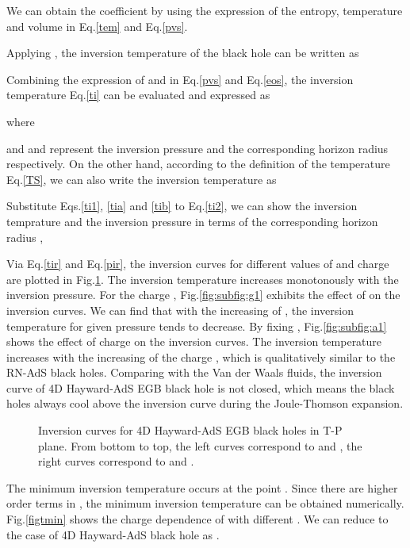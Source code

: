 \documentclass[aps,11pt]{revtex4}
\begin{document}
We can obtain the coefficient  by using the expression of the entropy, temperature and volume in Eq.\ref{tem} and Eq.\ref{pvs}.

Applying , the inversion temperature of the black hole can be written as

Combining the expression of  and  in Eq.\ref{pvs} and Eq.\ref{eos}, the inversion temperature Eq.\ref{ti} can be evaluated and expressed as

where

and  and  represent the inversion pressure and the corresponding horizon radius respectively. On the other hand, according to the definition of the temperature Eq.\ref{TS}, we can also write the inversion temperature as

Substitute Eqs.\ref{ti1}, \ref{tia} and \ref{tib} to Eq.\ref{ti2}, we can show the inversion temprature and the inversion pressure in terms of the corresponding horizon radius ,

Via Eq.\ref{tir} and Eq.\ref{pir}, the inversion curves for different values of  and charge  are plotted in Fig.\ref{figti}. The inversion temperature increases monotonously with the inversion pressure. For the charge , Fig.\ref{fig:subfig:g1} exhibits the effect of  on the inversion curves. We can find that with the increasing of , the inversion temperature for given pressure tends to decrease. By fixing , Fig.\ref{fig:subfig:a1} shows the effect of charge  on the inversion curves. The inversion temperature increases with the increasing of the charge , which is qualitatively similar to the RN-AdS black holes\cite{Okcu:2016tgt}. Comparing with the Van der Waals fluids, the inversion curve of 4D Hayward-AdS EGB black hole is not closed, which means the black holes always cool above the inversion curve during the Joule-Thomson expansion.

\begin{figure}[htb]
\centering
{}
\hfill
{}
\hfill
\caption{Inversion curves for 4D Hayward-AdS EGB black holes in T-P plane. From bottom to top, the left curves correspond to  and , the right curves correspond to  and .}\label{figti}
\end{figure}

The minimum inversion temperature  occurs at the point . Since there are higher order terms in , the minimum inversion temperature can be obtained numerically. Fig.\ref{figtmin} shows the charge  dependence of  with different . We can reduce to the case of 4D Hayward-AdS black hole as .
\end{document}
